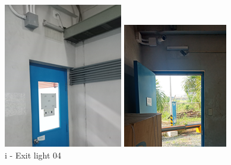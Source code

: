 \begin{figure}[!htb]
\begin{minipage}[b]{0.22\linewidth}
	\includegraphics[width=\textwidth]{figures/ch05_fdas_sd15}
	\caption*{i - Exit light 04}
\end{minipage}
	\hspace{0.03cm}
\begin{minipage}[b]{0.22\linewidth}
	\centering
	\includegraphics[width=\textwidth]{figures/ch05_fdas_sd16}

\end{minipage}
\end{figure}
